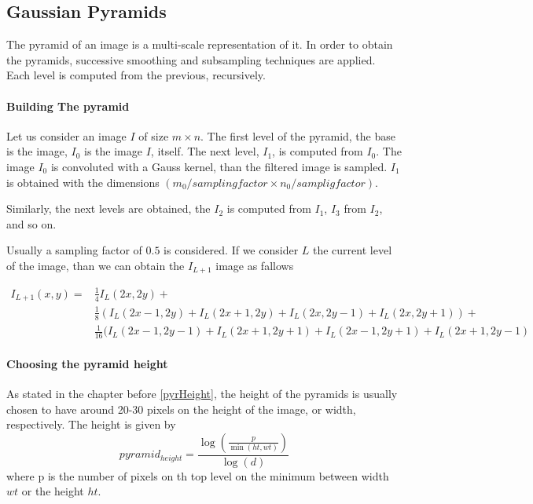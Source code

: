 \documentclass[12pt,a4paper,twoside]{report}
\begin{document}
\subsection{Gaussian Pyramids}
The pyramid of an image is a multi-scale representation of it. In order to obtain the pyramids, successive smoothing and subsampling techniques are applied.  Each level is computed from the previous, recursively.


\paragraph{Building The pyramid} 
 Let us consider an image $I$ of size $m \times n$. The first level of the pyramid, the base is the image, $I_0$ is the image $I$, itself. The next level, $I_1$, is computed from $I_0$. The image $I_0$ is convoluted with a Gauss kernel, than the filtered image is sampled. $I_1$ is obtained with the dimensions $(m_0/sampling factor \times n_0/samplig factor)$. 

Similarly, the next levels are obtained, the $I_2$ is computed from $I_1$, $I_3$ from $I_2$, and so on.

Usually a sampling factor of $0.5$ is considered. If we consider $L$ the current level of the image, than we can obtain the $I_{L+1}$ image as fallows



\begin{equation} \label{eq1}
\begin{split}
I_{L+1}(x,y) = &\frac{1}{4}I_L(2x,2y)+\\
&\frac{1}{8}(I_L(2x-1,2y)+I_L(2x+1,2y)+I_L(2x,2y-1)+I_L(2x,2y+1))+\\
&\frac{1}{16}(I_L(2x-1,2y-1)+I_L(2x+1,2y+1)+I_L(2x-1,2y+1)+I_L(2x+1,2y-1) 
\end{split}
\end{equation}


\paragraph{Choosing the pyramid height}
As stated in the chapter before \ref{pyrHeight}, the height of the pyramids is usually chosen to have around 20-30 pixels on the height of the image, or width, respectively. The height is given by
\begin{equation}
	pyramid_{height} = \frac{\log\left(\frac{p}{\min(ht,wt)}\right)}
							{\log(d)}
\end{equation}
where p is the number of pixels on th top level on the minimum between  width $wt$ or the height $ht$.
\end{document}
